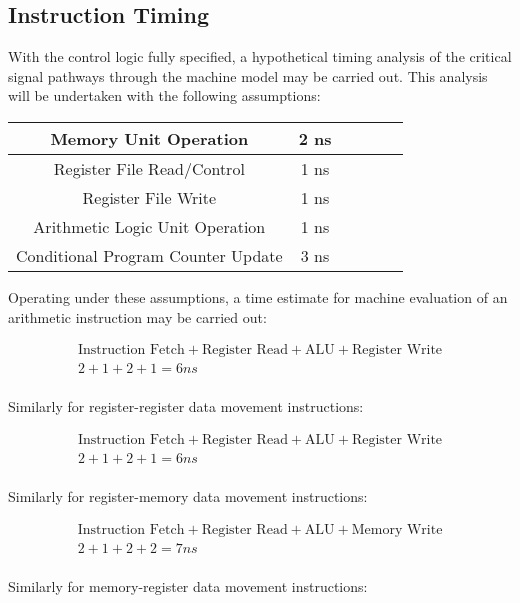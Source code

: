 \documentclass{article}
\begin{document}
\subsection{Instruction Timing}

With the control logic fully specified, a hypothetical timing analysis of the
critical signal pathways through the machine model may be carried out. This
analysis will be undertaken with the following assumptions:

\begin{center}
\begin{tabular}{|c|c|c|c|c|c|}
\hline
Memory Unit Operation & 2 ns \\ \hline
Register File Read/Control & 1 ns \\ \hline
Register File Write & 1 ns \\ \hline
Arithmetic Logic Unit Operation & 1 ns \\ \hline
Conditional Program Counter Update & 3 ns \\ \hline
\end{tabular}
\end{center}

Operating under these assumptions, a time estimate for machine evaluation of an
arithmetic instruction may be carried out:

\begin{gather*}
\text{Instruction Fetch} + \text{Register Read} + \text{ALU} + \text{Register Write} \\
2 + 1 + 2 + 1 = 6 ns \\
\end{gather*}

Similarly for register-register data movement instructions:

\begin{gather*}
\text{Instruction Fetch} + \text{Register Read} + \text{ALU} + \text{Register Write} \\
2 + 1 + 2 + 1 = 6 ns \\
\end{gather*}

Similarly for register-memory data movement instructions:

\begin{gather*}
\text{Instruction Fetch} + \text{Register Read} + \text{ALU} + \text{Memory Write} \\
2 + 1 + 2 + 2 = 7 ns \\
\end{gather*}

Similarly for memory-register data movement instructions:
\end{document}
